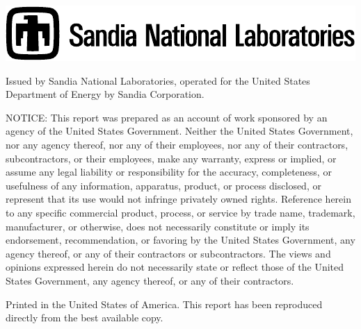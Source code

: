 {{\begin{minipage}[t]{6.0in}
{        \includegraphics{figures/snllineblk}
        }
        \end{minipage}

        \newpage
        \hspace{1.0in}
        \begin{minipage}[t]{5.0in}
            \fontsize{9}{11pt}
            \selectfont

            Issued by Sandia National Laboratories, operated for the
            United States Department of Energy by Sandia Corporation.
            \vspace{\baselineskip}

            {\fontsize{11}{13pt}\selectfont NOTICE:}
            This report was prepared
            as an account of work sponsored by an agency of
            the United States Government. Neither the United
            States Government, nor any agency thereof, nor any
            of their employees, nor any of their contractors,
            subcontractors, or their employees, make any warranty,
            express or implied, or assume any legal liability or
            responsibility for the accuracy, completeness, or
            usefulness of any information, apparatus, product,
            or process disclosed, or represent that its use
            would not infringe privately owned rights. Reference
            herein to any specific commercial product, process,
            or service by trade name, trademark, manufacturer, or
            otherwise, does not necessarily constitute or imply
            its endorsement, recommendation, or favoring by the
            United States Government, any agency thereof, or any
            of their contractors or subcontractors. The views and
            opinions expressed herein do not necessarily state
            or reflect those of the United States Government,
            any agency thereof, or any of their contractors.
            \vspace{\baselineskip}

            Printed in the United States of America. This report has
            been reproduced directly from the best available copy.
            \vspace{\baselineskip}


\end{minipage}}}
